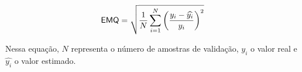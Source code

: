 
\begin{equation}\label{eq:emq}
\textsf{EMQ} = \sqrt{\frac{1}{N}
               \sum_{i=1}^{N}\left(\frac{y_i - \widehat{y_i}}{y_i}\right)^2}
\end{equation}

Nessa equação, $N$ representa o número de amostras de validação, $y_i$ o valor
real e $\widehat{y_i}$ o valor estimado.


